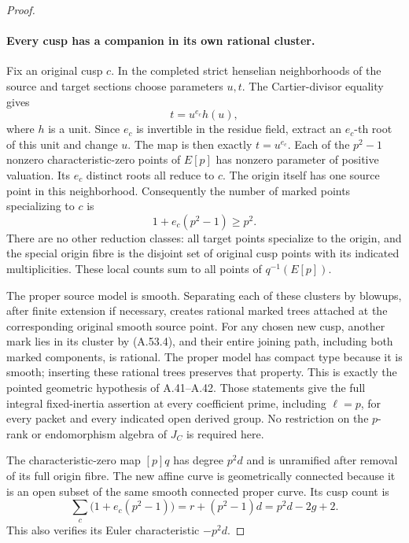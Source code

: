 \begin{proof}
\paragraph{Every cusp has a companion in its own rational cluster.}
Fix an original cusp \(c\). In the completed strict henselian
neighborhoods of the source and target sections choose parameters
\(u,t\). The Cartier-divisor equality gives
\[
                              t=u^{e_c}h(u),
                                                               \tag{A.53.3}
\]
where \(h\) is a unit. Since \(e_c\) is invertible in the residue
field, extract an \(e_c\)-th root of this unit and change \(u\).
The map is then exactly \(t=u^{e_c}\). Each of the \(p^2-1\)
nonzero characteristic-zero points of \(E[p]\) has nonzero parameter
of positive valuation. Its \(e_c\) distinct roots all reduce to
\(c\). The origin itself has one source point in this neighborhood.
Consequently the number of marked points specializing to \(c\) is
\[
                              1+e_c(p^2-1)\ge p^2.  \tag{A.53.4}
\]
There are no other reduction classes: all target points specialize
to the origin, and the special origin fibre is the disjoint set of
original cusp points with its indicated multiplicities. These local
counts sum to all points of \(q^{-1}(E[p])\).

The proper source model is smooth. Separating each of these clusters
by blowups, after finite extension if necessary, creates rational
marked trees attached at the corresponding original smooth source
point. For any chosen new cusp, another mark lies in its cluster by
(A.53.4), and their entire joining path, including both marked
components, is rational. The proper model has compact type because
it is smooth; inserting these rational trees preserves that property.
This is exactly the pointed geometric hypothesis of A.41--A.42.
Those statements give the full integral fixed-inertia assertion at
every coefficient prime, including \(\ell=p\), for every packet
and every indicated open derived group. No restriction on the
\(p\)-rank or endomorphism algebra of \(J_C\) is required here.

The characteristic-zero map \([p]q\) has degree \(p^2d\) and is
unramified after removal of its full origin fibre. The new affine
curve is geometrically connected because it is an open subset of
the same smooth connected proper curve. Its cusp count is
\[
 \sum_c\bigl(1+e_c(p^2-1)\bigr)
       =r+(p^2-1)d=p^2d-2g+2.                       \tag{A.53.5}
\]
This also verifies its Euler characteristic \(-p^2d\).


\end{proof}
